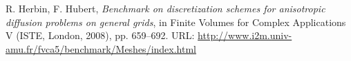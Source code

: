 \documentclass{article}
\begin{document}
\begin{thebibliography}{99}

 R. Herbin, F. Hubert, \emph{Benchmark on discretization schemes for anisotropic diffusion problems
on general grids}, in Finite Volumes for Complex Applications V (ISTE, London, 2008), pp. 659--692.
URL: \href{http://www.i2m.univ-amu.fr/fvca5/benchmark/Meshes/index.html}{http://www.i2m.univ-amu.fr/fvca5/benchmark/Meshes/index.html}

\end{thebibliography}
\end{document}
